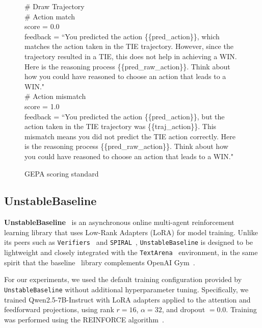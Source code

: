 \begin{figure}[H]
\begin{tcolorbox}
\# Draw Trajectory \\
\# Action match \\
score = 0.0 \\
feedback = ``You predicted the action \{\{pred\_action\}\}, which matches the action taken in the TIE trajectory. However, since the trajectory resulted in a TIE, this does not help in achieving a WIN. Here is the reasoning process \{\{pred\_raw\_action\}\}. Think about how you could have reasoned to choose an action that leads to a WIN." \\

\# Action mismatch \\
score = 1.0 \\
feedback = ``You predicted the action \{\{pred\_action\}\}, but the action taken in the TIE trajectory was \{\{traj\_action\}\}. This mismatch means you did not predict the TIE action correctly. Here is the reasoning process \{\{pred\_raw\_action\}\}. Think about how you could have reasoned to choose an action that leads to a WIN." \\

\end{tcolorbox}

\caption{GEPA scoring standard} \label{fig:gepa_scoring_standard}
\end{figure}

\subsection{UnstableBaseline} \label{app:baseline:unstable_baseline}
\textbf{UnstableBaseline}~\citep{Guertler_UnstableBaselines_2025} is an asynchronous online multi-agent reinforcement learning library that uses Low-Rank Adapters (LoRA) for model training. Unlike its peers such as \texttt{Verifiers}~\citep{brown_verifiers_2025} and \texttt{SPIRAL}~\citep{liu2025spiral}, \texttt{UnstableBaseline} is designed to be lightweight and closely integrated with the \texttt{TextArena}~\citep{guertler2025textarena} environment, in the same spirit that the baseline~\citep{baselines} library complements OpenAI Gym~\citep{1606.01540}. 

For our experiments, we used the default training configuration provided by \texttt{UnstableBaseline} without additional hyperparameter tuning.
Specifically, we trained Qwen2.5-7B-Instruct with LoRA adapters applied to the attention and feedforward projections, using rank $r=16$, $\alpha=32$, and dropout $=0.0$.
Training was performed using the REINFORCE algorithm~\citep{Williams:92}.

